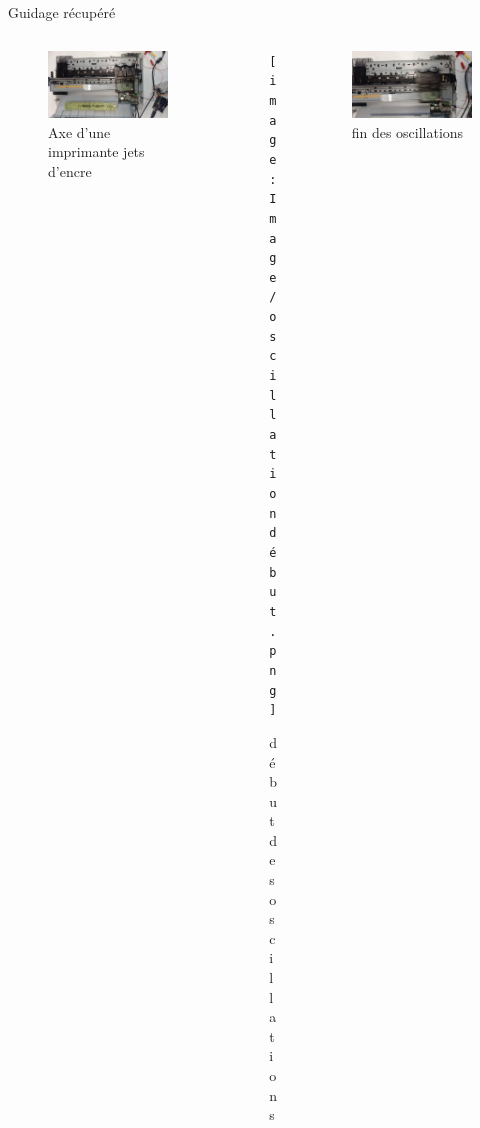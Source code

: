 \documentclass{beamer}
\begin{document}
	\begin{frame}{Guidage récupéré}
		\begin{columns}
			\begin{column}{0.3\textwidth}
				\begin{figure}
					\includegraphics[width=\textwidth]{Image/Imprimante.png}
					\caption{Axe d'une imprimante jets d'encre}
				\end{figure}
			\end{column}
			\begin{column}{0.3\textwidth} 
				\begin{figure}
					\texttt{[image: Image/oscillation début.png]}
					\caption{début des oscillations}
				\end{figure}
				
				
			\end{column}
			\begin{column}{0.3\textwidth} 
				\begin{figure}
					\includegraphics[width=\textwidth]{Image/oscillation fin.png}
					\caption{fin des oscillations}
				\end{figure}
				
			\end{column}
		\end{columns}
	\end{frame}
\end{document}

